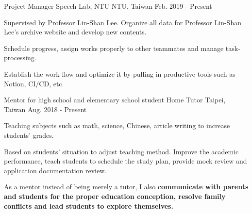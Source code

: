 

\begin{cventries}

  \cventry
    {Project Manager} %
    {Speech Lab, NTU} %
    {NTU, Taiwan} %
    {Feb. 2019 - Present} %
    {
      \begin{cvitems} %
        \item {Supervised by Professor Lin-Shan Lee. Organize all data for Professor Lin-Shan Lee's archive website and develop new contents.}
        \item {Schedule progress, assign works properly to other teammates and manage task-processing.}
        \item {Establish the work flow and optimize it by pulling in productive tools such as Notion, CI/CD, etc.}
      \end{cvitems}
    }

  \cventry
    {Mentor for high school and elementary school student} %
    {Home Tutor} %
    {Taipei, Taiwan} %
    {Aug. 2018 - Present} %
    {
      \begin{cvitems} %
        \item {Teaching subjects such as math, science, Chinese, article writing to increase students' grades.}
        \item {Based on students' situation to adjust teaching method. Improve the academic performance, teach students to schedule the study plan, provide mock review and application documentation review.}
        \item {As a mentor instead of being merely a tutor, I also \textbf{communicate with parents and students for the proper education conception, resolve family conflicts and lead students to explore themselves.}}
      \end{cvitems}
    }

 

\end{cventries}

